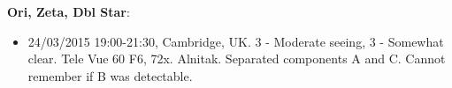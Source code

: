 {\bf Ori, Zeta, Dbl Star}:
\begin{itemize}
\item 24/03/2015 19:00-21:30, Cambridge, UK. 3 - Moderate seeing, 3 - Somewhat clear. Tele Vue 60 F6, 72x. Alnitak. Separated components A and C. Cannot remember if B was detectable.
\end{itemize}
